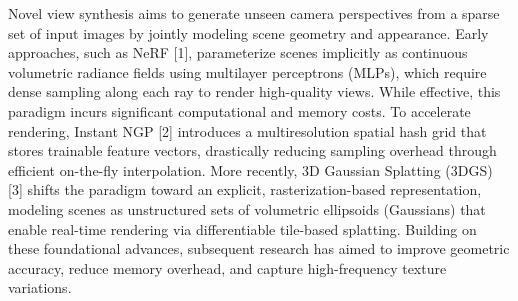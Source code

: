 \documentclass[acmtog,anonymous,review]{acmart}
\begin{document}
Novel view synthesis aims to generate unseen camera perspectives from a sparse set of input images by jointly modeling scene geometry and appearance. Early approaches, such as NeRF [1], parameterize scenes implicitly as continuous volumetric radiance fields using multilayer perceptrons (MLPs), which require dense sampling along each ray to render high-quality views. While effective, this paradigm incurs significant computational and memory costs. To accelerate rendering, Instant NGP [2] introduces a multiresolution spatial hash grid that stores trainable feature vectors, drastically reducing sampling overhead through efficient on-the-fly interpolation. More recently, 3D Gaussian Splatting (3DGS) [3] shifts the paradigm toward an explicit, rasterization-based representation, modeling scenes as unstructured sets of volumetric ellipsoids (Gaussians) that enable real-time rendering via differentiable tile-based splatting.
Building on these foundational advances, subsequent research has aimed to improve geometric accuracy, reduce memory overhead, and capture high-frequency texture variations. 
\end{document}
